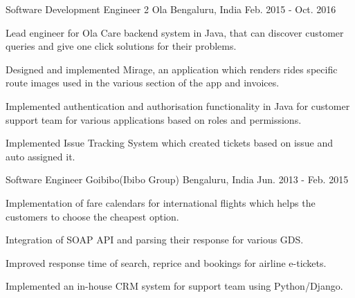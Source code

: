 \begin{cventries}
  \cventry
    {Software Development Engineer 2} %
    {Ola} %
    {Bengaluru, India} %
    {Feb. 2015 - Oct. 2016} %
    {
      \begin{cvitems} %
        \item {Lead engineer for Ola Care backend system in Java, that can discover customer queries and give one click solutions for their problems.}
        \item {Designed and implemented Mirage, an application which renders rides specific route images used in the various section of the app and invoices.}
        \item {Implemented authentication and authorisation functionality in Java for customer support team for various applications based on roles and permissions.}
        \item {Implemented Issue Tracking System which created tickets based on issue and auto assigned it.}
      \end{cvitems}
    }
  \cventry
    {Software Engineer} %
    {Goibibo(Ibibo Group)} %
    {Bengaluru, India} %
    {Jun. 2013 - Feb. 2015} %
    {
      \begin{cvitems} %
        \item {Implementation of fare calendars for international flights which helps the customers to choose the cheapest option.}
        \item {Integration of SOAP API and parsing their response for various GDS.}
        \item {Improved response time of search, reprice and bookings for airline e-tickets.}
        \item {Implemented an in-house CRM system for support team using Python/Django.}
      \end{cvitems}
    }

\end{cventries}
